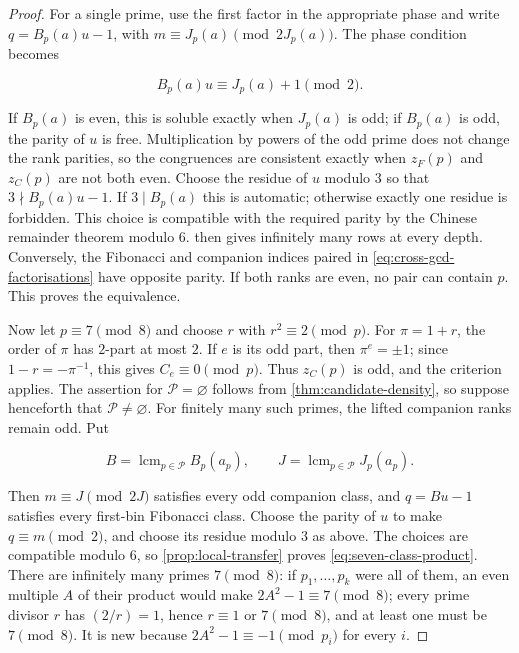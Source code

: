 \begin{proof}
For a single prime, use the first factor in the appropriate phase and write
$q=B_p(a)u-1$, with
$m\equiv J_p(a)\pmod {2J_p(a)}$. The phase condition becomes

\begin{equation}
 B_p(a)u\equiv J_p(a)+1\pmod2.
\end{equation}

If $B_p(a)$ is even, this is soluble exactly when $J_p(a)$ is odd; if
$B_p(a)$ is odd, the parity of $u$ is free. Multiplication by powers of the
odd prime does not change the rank parities, so the congruences are
consistent exactly when $z_F(p)$ and $z_C(p)$ are not both even. Choose the
residue of $u$ modulo $3$ so that $3\nmid B_p(a)u-1$. If
$3\mid B_p(a)$ this is automatic; otherwise exactly one residue is
forbidden. This choice is compatible with the required parity by the Chinese
remainder theorem modulo $6$.
 then gives infinitely many rows at every depth.
Conversely, the Fibonacci and companion indices paired in
\cref{eq:cross-gcd-factorisations} have opposite parity. If both ranks are
even, no pair can contain $p$. This proves the equivalence.

Now let $p\equiv7\pmod8$ and choose $r$ with $r^2\equiv2\pmod p$. For
$\pi=1+r$, the order of $\pi$ has $2$-part at most $2$. If $e$ is its odd
part, then $\pi^e=\pm1$; since $1-r=-\pi^{-1}$, this gives
$C_e\equiv0\pmod p$. Thus $z_C(p)$ is odd, and the criterion applies.
The assertion for $\mathcal P=\varnothing$ follows from
\cref{thm:candidate-density}, so suppose henceforth that
$\mathcal P\ne\varnothing$.
For finitely many such primes, the lifted companion ranks remain odd. Put

\[
 B=\operatorname{lcm}_{p\in\mathcal P}B_p(a_p),
 \qquad
 J=\operatorname{lcm}_{p\in\mathcal P}J_p(a_p).
\]

Then $m\equiv J\pmod {2J}$ satisfies every odd companion class, and
$q=Bu-1$ satisfies every first-bin Fibonacci class. Choose the parity of
$u$ to make $q\equiv m\pmod2$, and choose its residue modulo $3$ as above.
The choices are compatible modulo $6$, so \cref{prop:local-transfer} proves
\cref{eq:seven-class-product}. There are
infinitely many primes $7\pmod8$: if $p_1,\ldots,p_k$ were all of them,
an even multiple $A$ of their product would make $2A^2-1\equiv7\pmod8$;
every prime divisor $r$ has $(2/r)=1$, hence
$r\equiv1$ or $7\pmod8$, and at least one must be $7\pmod8$. It is new
because $2A^2-1\equiv-1\pmod {p_i}$ for every $i$.


\end{proof}
